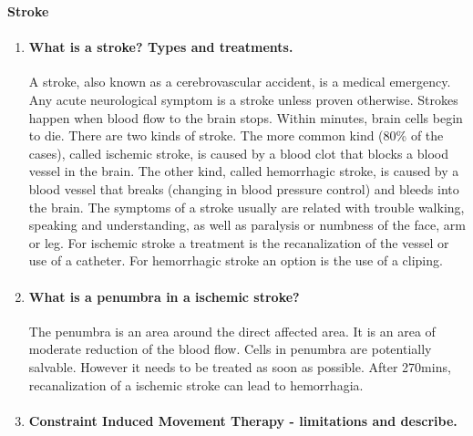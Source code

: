 \documentclass[12pt,article,oneside,a4paper]{memoir}
\begin{document}
\textbf{Stroke}\\
\begin{enumerate}
\item \paragraph{What is a stroke? Types and treatments.}
A stroke, also known as a cerebrovascular accident, is a medical emergency. Any
acute neurological symptom is a stroke unless proven otherwise. Strokes happen
when blood flow to the brain stops.
Within minutes, brain cells begin to die. There are two kinds of stroke. The
more common kind (80\% of the cases), called ischemic stroke, is caused by a
blood clot that blocks a blood vessel in the brain. The other kind, called
hemorrhagic stroke, is caused by a blood vessel that breaks (changing in blood
pressure control) and bleeds into the brain.
The symptoms of a stroke usually are related with trouble walking, speaking and
understanding, as well as paralysis or numbness of the face, arm or leg.
For ischemic stroke a treatment is the recanalization of the vessel or use of a
catheter. For hemorrhagic stroke an option is the use of a cliping.

\item \paragraph{What is a penumbra in a ischemic stroke?}
The penumbra is an area around the direct affected area. It is an area of
moderate reduction of the blood flow. Cells in penumbra are potentially
salvable. However it needs to be treated as soon as possible. After 270mins,
recanalization of a ischemic stroke can lead to hemorrhagia.

\item \paragraph{Constraint Induced Movement Therapy - limitations and
describe.}


\end{enumerate}
\end{document}
